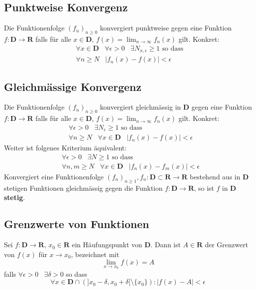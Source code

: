 \documentclass[8pt]{article}
\begin{document}
\begin{multicols*}{3}
 \subsection{Punktweise Konvergenz}
Die Funktionenfolge $(f_n)_{n \geq 0}$ konvergiert punktweise gegen eine Funktion
$f:\mathbf{D} \rightarrow \mathbf{R}$ falls für alle $x \in \mathbf{D}$, $f(x) = \lim_{n \rightarrow \infty} f_n(x)$ gilt. Konkret:
\begin{align*}
  &\forall x \in \mathbf{D} \;\;\; \forall \epsilon > 0 \;\;\; \exists N_{x, \epsilon} \geq 1 \text{ so dass }\\
  &\forall n \geq N \;\;\; |f_n(x) - f(x)| < \epsilon
\end{align*}
 \subsection{Gleichmässige Konvergenz}
Die Funktionenfolge $(f_n)_{n \geq 0}$ konvergiert gleichmässig in $\mathbf{D}$ gegen eine Funktion
$f:\mathbf{D} \rightarrow \mathbf{R}$ falls für alle $x \in \mathbf{D}$, $f(x) = \lim_{n \rightarrow \infty} f_n(x)$ gilt. Konkret:
\begin{align*}
  &\forall \epsilon > 0 \;\;\; \exists N_{\epsilon} \geq 1 \text{ so dass }\\
  &\forall n \geq N \;\;\;\forall x \in \mathbf{D} \;\;\; |f_n(x) - f(x)| < \epsilon
\end{align*}
Weiter ist folgenes Kriterium äquivalent:
\begin{align*}
  &\forall \epsilon > 0 \;\;\; \exists N \geq 1 \text{ so dass }\\
  &\forall n, m \geq N \;\;\;\forall x \in \mathbf{D} \;\;\; |f_n(x) - f_m(x)| < \epsilon
\end{align*}
Konvergiert eine Funktionenfolge $(f_n)_{n \geq 1}, f_n:\mathbf{D} \subset \mathbf{R} \rightarrow \mathbf{R}$
bestehend aus in $\mathbf{D}$ stetigen Funktionen gleichmässig gegen die Funktion $f:\mathbf{D} \rightarrow \mathbf{R}$, so
ist $f$ in $\mathbf{D}$ \textbf{stetig}.
  \subsection {Grenzwerte von Funktionen}
Sei $f:\mathbf{D} \rightarrow \mathbf{R}$, $x_0 \in \mathbf{R}$ ein Häufungspunkt von $\mathbf{D}$.
Dann ist $A \in \mathbf{R}$ der Grenzwert von $f(x)$ für $x \rightarrow x_0$, bezeichnet mit
$$
  \lim_{x \rightarrow x_0} f(x) = A
$$
falls $\forall \epsilon > 0 \;\;\; \exists \delta > 0$ so dass
$$
  \forall x \in \mathbf{D} \cap (]x_0-\delta, x_0 + \delta[ \setminus \{x_0\}) : |f(x) - A| < \epsilon
$$

\end{multicols*}
\end{document}

